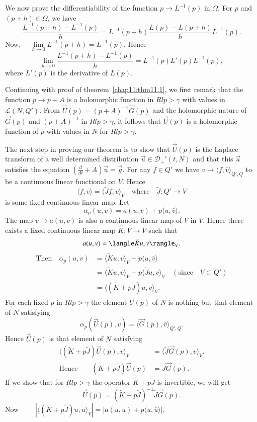 We now prove the differentiability of the function $p \to L^{-1}(p)$
in $\Omega$. For $p$ and $(p+h) \in \Omega$, we have
$$
\frac{L^{-1}(p+h)-L^{-1}(p)}{h}= L^{-1}(p+h) 
\frac{L(p)-L(p+h)}{h}L^{-1}(p).
$$
Now, $\quad \lim\limits_{h \to 0} L^{-1}(p+h) = L^{-1}(p)$. Hence
$$
\lim\limits_{h \to 0}\frac{L^{-1}(p+h)-L^{-1}(p)}{h}=L^{-1}(p)L'(p)
L^{-1}(p),
$$
where $L'(p)$ is the derivative of $L(p)$. 

Continuing with proof of theorem~\ref{chap11:thm11.1}, we first remark that the
function $p \to p+A$ is a holomorphic function in $Rl p > \gamma$ with
values in $\mathscr{L}(N, Q')$. From
$\overrightarrow{U}(p)=(p+A)^{-1}\overrightarrow{G}(p)$ and the
holomorphic nature of $\overrightarrow{G}(p)$ and $(p+A)^{-1}$ in $Rl
p > \gamma$, it follows that $\overrightarrow{U}(p)$ is a holomorphic
function of $p$ with values in $N$ for $Rl p > \gamma$. 

The next step in proving our theorem is to show that
$\overrightarrow{U}(p)$ is the Laplace transform of a well determined
distribution $\overrightarrow{u} \in \mathscr{D}_+'(t, N)$ and that
this $\overrightarrow{u}$ satisfies the equation
$(\frac{d}{dt}+A)\overrightarrow{u}=\overrightarrow{g}$. For any $f
\in Q'$ we have $v \to \langle f, \bar{v}\rangle_{Q', Q}$ to be a
continuous linear functional on $V$. Hence
$$
\langle f, \bar{v}\rangle = \langle \tilde{J} f, v\rangle_V \quad
\text {where} \quad \tilde{J} : Q' \to V
$$
is some fixed continuous linear map. Let
$$
\alpha_p (u, v)= a (u, v) + p \langle u, \bar{v}\rangle.
$$
The map $v \to a (u, v)$ is also a continuous linear map of $V$ in
$V$. Hence there exists a fixed continuous linear map $\tilde{K} : V
\to V$ such  that 
$$
\hfill a(u, v) = \langle \tilde{K}u, v\rangle_V.  
$$
\begin{align*}
\text{Then} \quad \alpha_p(u, v) &= \langle \tilde{K}u, v\rangle_V + p
\langle u, \bar{v}\rangle\\
&= \langle \tilde{K}u, v\rangle_V + p \langle \tilde{J} u, v\rangle_V
\quad (\text{since} \quad V\subset Q')\\
&= \langle (\tilde{K} + p\tilde{J}) u, v \rangle_V.
\end{align*}\pageoriginale
For each fixed $p$ in $Rl p > \gamma$ the element
$\overrightarrow{U}(p)$ of $N$ is nothing but that element of $N$
satisfying
$$
\alpha_p (\overrightarrow{U}(p), v) = \langle \overrightarrow{G}(p),
\bar{v}\rangle_{Q', Q}.
$$
Hence $\overrightarrow{U}(p)$ is that element of $N$ satisfying 
\begin{align*}
\langle (\tilde{K} + p\tilde{J}) \overrightarrow{U} (p), v \rangle_V
&= \langle \tilde{J} \overrightarrow{G}(p), v \rangle_V.\\
\text{Hence}\qquad  (\tilde{K} + p\tilde{J}) \overrightarrow{U}(p) &=
\tilde{J} \overrightarrow{G} (p).
\end{align*}
If we show that for $Rl p > \gamma$ the operator $\tilde{K} + p
\tilde{J}$ is invertible, we will get 
$$
\overrightarrow{U}(p) = (\tilde{K} + p \tilde{J})^{-1} \tilde{J}
\overrightarrow{G}(p).
$$
Now $\qquad \left| \langle (\tilde{K} + p\tilde{J})u, u
\rangle_V\right| = \left| a(u, u) + p \langle u, \bar{u}\rangle
\right|$.

